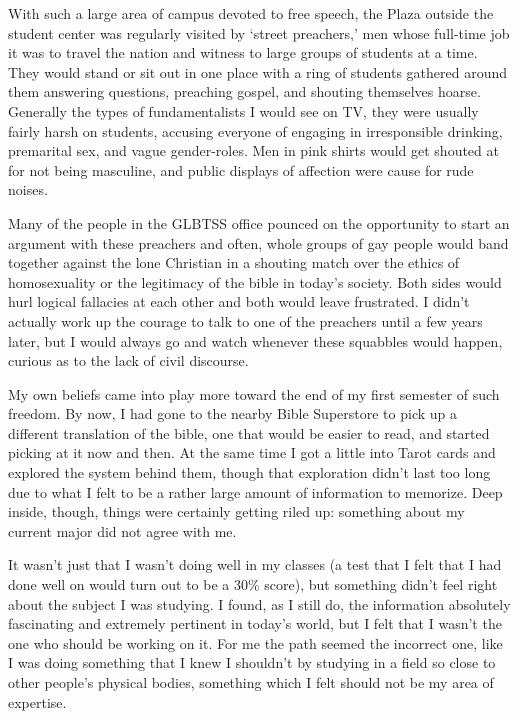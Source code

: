 \documentclass{book}
\begin{document}
With such a large area of campus devoted to free speech, the Plaza outside the student center was regularly visited by `street preachers,' men whose full-time job it was to travel the nation and witness to large groups of students at a time.  They would stand or sit out in one place with a ring of students gathered around them answering questions, preaching gospel, and shouting themselves hoarse.  Generally the types of fundamentalists I would see on TV, they were usually fairly harsh on students, accusing everyone of engaging in irresponsible drinking, premarital sex, and vague gender-roles.  Men in pink shirts would get shouted at for not being masculine, and public displays of affection were cause for rude noises.

Many of the people in the GLBTSS office pounced on the opportunity to start an argument with these preachers and often, whole groups of gay people would band together against the lone Christian in a shouting match over the ethics of homosexuality or the legitimacy of the bible in today's society.  Both sides would hurl logical fallacies at each other and both would leave frustrated.  I didn't actually work up the courage to talk to one of the preachers until a few years later, but I would always go and watch whenever these squabbles would happen, curious as to the lack of civil discourse.

My own beliefs came into play more toward the end of my first semester of such freedom.  By now, I had gone to the nearby Bible Superstore to pick up a different translation of the bible, one that would be easier to read, and started picking at it now and then.  At the same time I got a little into Tarot cards and explored the system behind them, though that exploration didn't last too long due to what I felt to be a rather large amount of information to memorize.  Deep inside, though, things were certainly getting riled up: something about my current major did not agree with me.

It wasn't just that I wasn't doing well in my classes (a test that I felt that I had done well on would turn out to be a 30\% score), but something didn't feel right about the subject I was studying.  I found, as I still do, the information absolutely fascinating and extremely pertinent in today's world, but I felt that I wasn't the one who should be working on it.  For me the path seemed the incorrect one, like I was doing something that I knew I shouldn't by studying in a field so close to other people's physical bodies, something which I felt should not be my area of expertise.
\end{document}
